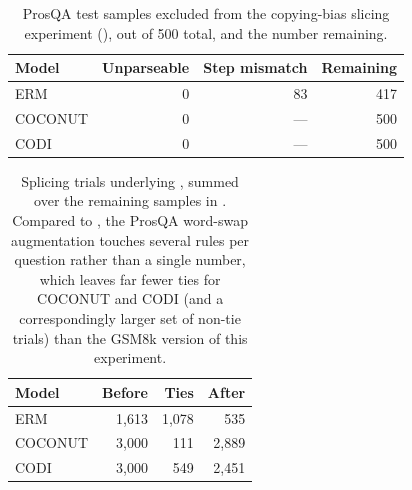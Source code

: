 \documentclass[11pt]{article}
\begin{document}
\begin{table}[h]
\centering
\small
\begin{tabular}{lrrr}
\toprule
Model & Unparseable & Step mismatch & Remaining \\
\midrule
ERM      & 0 & 83  & 417 \\
COCONUT  & 0 & --- & 500 \\
CODI     & 0 & --- & 500 \\
\bottomrule
\end{tabular}
\caption{ProsQA test samples excluded from the copying-bias slicing experiment (), out of 500 total, and the number remaining.}
\label{tab:exclusion-prosqa}
\end{table}

\begin{table}[h]
\centering
\small
\begin{tabular}{lrrr}
\toprule
Model & Before & Ties & After \\
\midrule
ERM      & 1{,}613 & 1{,}078 & 535   \\
COCONUT  & 3{,}000 & 111     & 2{,}889 \\
CODI     & 3{,}000 & 549     & 2{,}451 \\
\bottomrule
\end{tabular}
\caption{Splicing trials underlying , summed over the remaining samples in . Compared to , the ProsQA word-swap augmentation touches several rules per question rather than a single number, which leaves far fewer ties for COCONUT and CODI (and a correspondingly larger set of non-tie trials) than the GSM8k version of this experiment.}
\label{tab:exclusion-trials-prosqa}
\end{table}
\end{document}
